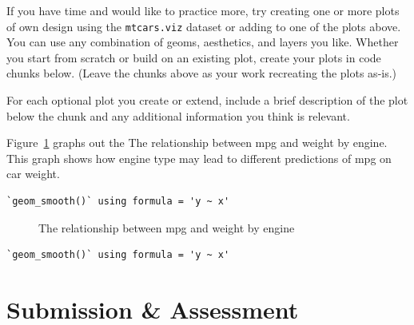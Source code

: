 \documentclass[
  man,
  floatsintext,
  longtable,
  nolmodern,
  notxfonts,
  notimes,
  colorlinks=true,linkcolor=blue,citecolor=blue,urlcolor=blue]{apa7}
\begin{document}
If you have time and would like to practice more, try creating one or
more plots of own design using the \texttt{mtcars.viz} dataset or adding
to one of the plots above. You can use any combination of geoms,
aesthetics, and layers you like. Whether you start from scratch or build
on an existing plot, create your plots in code chunks below. (Leave the
chunks above as your work recreating the plots as-is.)

For each optional plot you create or extend, include a brief description
of the plot below the chunk and any additional information you think is
relevant.

Figure~\ref{fig-optional-plot-1} graphs out the The relationship between
mpg and weight by engine. This graph shows how engine type may lead to
different predictions of mpg on car weight.

\begin{verbatim}
`geom_smooth()` using formula = 'y ~ x'
\end{verbatim}

\begin{figure}[H]

\caption{\label{fig-optional-plot-1}The relationship between mpg and
weight by engine}


\end{figure}%

\begin{verbatim}
`geom_smooth()` using formula = 'y ~ x'
\end{verbatim}

\section{Submission \& Assessment}\label{submission-assessment}
\end{document}
